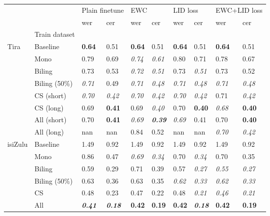 \begin{tabular}{llllllllll}
\toprule
 &  & \multicolumn{2}{l}{Plain finetune} & \multicolumn{2}{l}{EWC} & \multicolumn{2}{l}{LID loss} & \multicolumn{2}{l}{EWC+LID loss} \\
 &  & wer & cer & wer & cer & wer & cer & wer & cer \\
 & Train dataset &  &  &  &  &  &  &  &  \\
\midrule
Tira & Baseline & \textbf{0.64} & 0.51 & \textbf{0.64} & 0.51 & \textbf{0.64} & 0.51 & \textbf{0.64} & 0.51 \\
 & Mono & 0.79 & 0.69 & \textit{0.74} & \textit{0.61} & 0.80 & 0.71 & 0.78 & 0.67 \\
 & Biling & 0.73 & 0.53 & \textit{0.72} & \textit{0.51} & 0.73 & \textit{0.51} & 0.73 & 0.52 \\
 & Biling (50\%) & \textit{0.71} & 0.49 & \textit{0.71} & \textit{0.48} & \textit{0.71} & \textit{0.48} & \textit{0.71} & \textit{0.48} \\
 & CS (short) & \textit{0.70} & \textit{0.42} & \textit{0.70} & \textit{0.42} & \textit{0.70} & \textit{0.42} & 0.71 & \textit{0.42} \\
 & CS (long) & 0.69 & \textbf{0.41} & 0.69 & \textit{0.40} & 0.70 & \textbf{0.40} & \textit{0.68} & \textbf{0.40} \\
 & All (short) & 0.70 & \textbf{0.41} & \textit{0.69} & \textit{\textbf{0.39}} & \textit{0.69} & 0.41 & 0.70 & \textbf{0.40} \\
 & All (long) & nan & nan & 0.84 & 0.52 & nan & nan & \textit{0.70} & \textit{0.42} \\
\midrule
isiZulu & Baseline & 1.49 & 0.92 & 1.49 & 0.92 & 1.49 & 0.92 & 1.49 & 0.92 \\
 & Mono & 0.86 & 0.47 & \textit{0.69} & \textit{0.34} & 0.70 & \textit{0.34} & 0.70 & 0.35 \\
 & Biling & 0.59 & 0.29 & 0.71 & 0.39 & 0.57 & \textit{0.27} & \textit{0.55} & \textit{0.27} \\
 & Biling (50\%) & 0.63 & 0.36 & 0.63 & 0.35 & \textit{0.62} & \textit{0.33} & \textit{0.62} & \textit{0.33} \\
 & CS & 0.48 & 0.23 & 0.47 & 0.22 & 0.48 & \textit{0.21} & \textit{0.46} & \textit{0.21} \\
 & All & \textit{\textbf{0.41}} & \textit{\textbf{0.18}} & \textbf{0.42} & \textbf{0.19} & \textbf{0.42} & \textit{\textbf{0.18}} & \textbf{0.42} & \textbf{0.19} \\
\bottomrule
\end{tabular}
